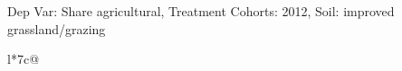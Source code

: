 \begin{table}[H]
\captionlistentry[table]{}
\label{table:beaver_land_class_DVis_land_class_1_SCg1_SSIGRG}
\scriptsize %
Dep Var: Share agricultural, Treatment Cohorts: 2012, Soil: improved grassland/grazing \\
\begin{threeparttable}
\begin{tabulary}{\textwidth}{l*{7}{c}@{}}
\toprule \toprule
\noalign{\smallskip}
\noalign{\smallskip}
\midrule \bottomrule
\end{tabulary}
\medskip
\end{threeparttable}
\end{table}
